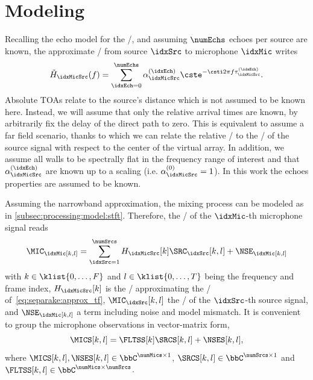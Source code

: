 \section{Modeling}
Recalling the echo model for the \RIRs/, and assuming $\numEchs$ echoes per source are known, the approximate \RTFdef/ from source $\idxSrc$ to microphone $\idxMic$ writes
\begin{equation}
    \label{eq:separake:approx_tf}
    \tilde{H}_{\idxMicSrc}(f) = \sum_{\idxEch=0}^{\numEchs} \alpha_{\idxMicSrc}^{(\idxEch)} \cste^{-\csti 2 \pi f \tau_{\idxMicSrc}^{(\idxEch)}}.
\end{equation}
Absolute  \acsp{TOA} relate to the source's distance which is not assumed to be known here.
Instead, we will assume that only the relative arrival times are known, by arbitrarily fix the delay of the direct path to zero.
This is equivalent to assume a far field scenario, thanks to which we can relate the relative \TOAs/ to the \DOAsdef/ of the source signal with respect to the center of the virtual array.
In addition, we assume all walls to be spectrally flat in the frequency range of interest and that $\alpha_{\idxMicSrc}^{(\idxEch)}$ are known up to a scaling (i.e. $\alpha_{\idxMicSrc}^{(0)} = 1$).
In this work the echoes properties are assumed to be known.

\mynewline
Assuming the narrowband approximation, the mixing process can be modeled as in \cref{subsec:processing:model:stft}.
Therefore, the \STFTdef/ of the $\idxMic$-th microphone signal reads
\begin{equation}
    \label{eq:separake:stft}
    \MIC_\idxMic[k,l] = \sum_{\idxSrc = 1}^{\numSrcs} H_{\idxMicSrc}[k] \SRC_{\idxSrc}[k,l] + \NSE_\idxMic[k,l]
\end{equation}
with $k\in\klist{0,\ldots,F}$ and $l\in\klist{0,\ldots,T}$ being the frequency and frame index,
$H_{\idxMicSrc}[k]$ is the \DFT/ approximating the \RTF/ of~\eqref{eq:separake:approx_tf},
$\MIC_{\idxSrc}[k,l]$ the \STFT/ of the $\idxSrc$-th source signal, and $\NSE_\idxMic[k,l]$ a term including noise and model mismatch.
It is convenient to group the microphone observations in vector-matrix form,
\begin{equation}
    \MICS[k,l] = \FLTSS[k]\SRCS[k,l] + \NSES[k,l]
    ,
\end{equation}
where $\MICS[k,l],  \NSES[k,l] \in \bbC^{\numMics \times 1}$, $\SRCS[k,l] \in \bbC^{\numSrcs \times 1}$ and $\FLTSS[k,l] \in \bbC^{\numMics \times \numSrcs}$.

